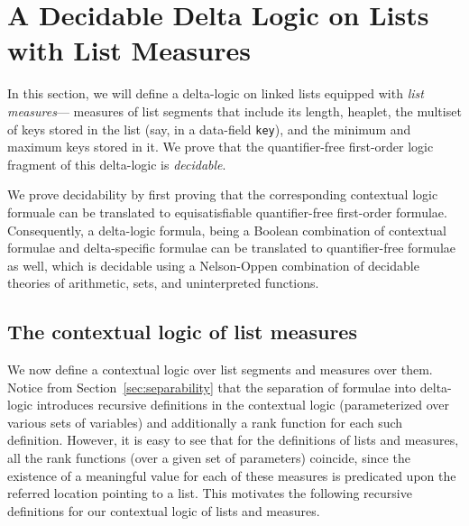 \section{A Decidable Delta Logic on Lists with List Measures}
\label{sec:declogic}
In this section, we will define a delta-logic on linked lists equipped with \emph{list measures}--- measures of
list segments that include its length, heaplet, the multiset of keys stored in the list (say, in a data-field {\tt key}),
and the minimum and maximum keys stored in it. We prove that the quantifier-free first-order logic fragment of this delta-logic 
is \emph{decidable}. 

We prove decidability by first proving that the corresponding contextual logic formuale can be translated to equisatisfiable quantifier-free first-order
formulae. Consequently, a delta-logic formula, being a Boolean combination of contextual formulae and delta-specific
formulae can be translated to quantifier-free formulae as well, which is decidable using a Nelson-Oppen combination of decidable theories of arithmetic, sets, and uninterpreted functions.


\subsection*{The contextual logic of list measures}
We  now define a contextual logic over list segments and measures over them. Notice from Section~\ref{sec:separability} that the separation of formulae into delta-logic introduces recursive definitions in the contextual logic (parameterized over various sets of variables) and additionally a rank function for each such definition. However, it is easy to see that for the definitions of lists and measures, all the rank functions (over a given set of parameters) coincide, since the existence of a meaningful value for each of these measures is predicated upon the referred location pointing to a list. This motivates the following recursive definitions for our contextual logic of lists and measures.

